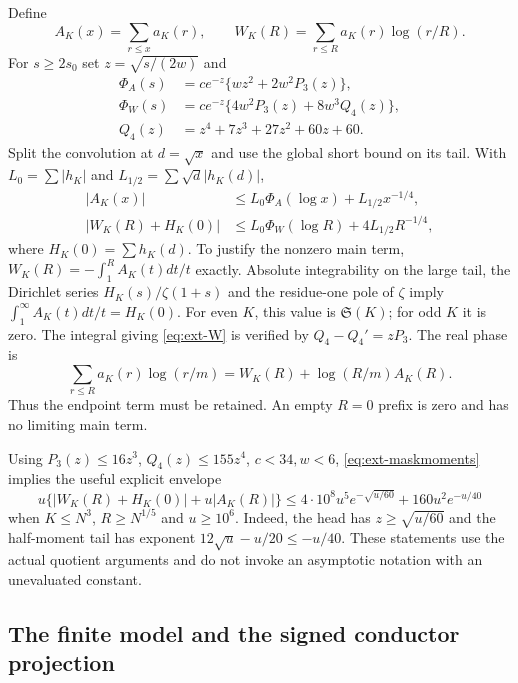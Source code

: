 \documentclass[11pt,a4paper]{article}
\theoremstyle{definition}
\theoremstyle{remark}
\begin{document}
Define
\[
 A_K(x)=\sum_{r\leq x}a_K(r),\qquad
 W_K(R)=\sum_{r\leq R}a_K(r)\log(r/R).
\]
For $s\geq2s_0$ set $z=\sqrt{s/(2w)}$ and
\begin{align*}
 \Phi_A(s)&=ce^{-z}\{wz^2+2w^2P_3(z)\},\\
 \Phi_W(s)&=ce^{-z}\{4w^2P_3(z)+8w^3Q_4(z)\},\\
 Q_4(z)&=z^4+7z^3+27z^2+60z+60.
\end{align*}
Split the convolution at $d=\sqrt x$ and use the global short bound
on its tail. With $L_0=\sum|h_K|$ and $L_{1/2}=\sum\sqrt d|h_K(d)|$,
\begin{align}
 |A_K(x)|&\leq L_0\Phi_A(\log x)+L_{1/2}x^{-1/4},\label{eq:ext-A}\\
 |W_K(R)+H_K(0)|&\leq L_0\Phi_W(\log R)
                       +4L_{1/2}R^{-1/4},\label{eq:ext-W}
\end{align}
where $H_K(0)=\sum h_K(d)$. To justify the nonzero main term,
$W_K(R)=-\int_1^R A_K(t)dt/t$ exactly. Absolute integrability on the
large tail, the Dirichlet series $H_K(s)/\zeta(1+s)$ and the residue-one
pole of $\zeta$ imply $\int_1^\infty A_K(t)dt/t=H_K(0)$.
For even $K$, this value is $\mathfrak S(K)$; for odd $K$ it is zero.
The integral giving \eqref{eq:ext-W} is verified by
$Q_4-Q_4'=zP_3$. The real phase is
\begin{equation}\label{eq:ext-logshift}
 \sum_{r\leq R}a_K(r)\log(r/m)
       =W_K(R)+\log(R/m)A_K(R).
\end{equation}
Thus the endpoint term must be retained. An empty $R=0$ prefix is
zero and has no limiting main term.

Using $P_3(z)\leq16z^3$, $Q_4(z)\leq155z^4$, $c<34,w<6$,
\eqref{eq:ext-maskmoments} implies the useful explicit envelope
\begin{equation}\label{eq:ext-prefix-envelope}
 u\{|W_K(R)+H_K(0)|+u|A_K(R)|\}
 \leq4\cdot10^8u^5e^{-\sqrt{u/60}}+160u^2e^{-u/40}
\end{equation}
when $K\leq N^3$, $R\geq N^{1/5}$ and $u\geq10^6$.
Indeed, the head has $z\geq\sqrt{u/60}$ and the half-moment tail
has exponent $12\sqrt u-u/20\leq-u/40$. These statements use the
actual quotient arguments and do not invoke an asymptotic notation
with an unevaluated constant.

\subsection{The finite model and the signed conductor projection}
\end{document}
